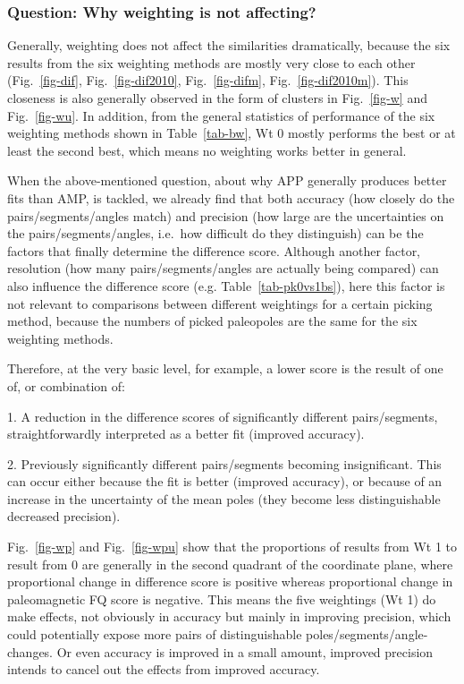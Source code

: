\subsubsection{Question: Why weighting is not affecting?}

Generally, weighting does not affect the similarities dramatically, because the
six results from the six weighting methods are mostly very close to each other
(Fig.~\ref{fig-dif}, Fig.~\ref{fig-dif2010}, Fig.~\ref{fig-difm},
Fig.~\ref{fig-dif2010m}). This closeness is also generally observed in the form
of clusters in Fig.~\ref{fig-w} and Fig.~\ref{fig-wu}. In addition, from the
general statistics of performance of the six weighting methods shown in
Table~\ref{tab-bw}, Wt 0 mostly performs the best or at least the
second best, which means no weighting works better in general.

When the above-mentioned question, about why APP generally produces better fits
than AMP, is tackled, we already find that both accuracy (how closely do the
pairs/segments/angles match) and precision (how large are the uncertainties on
the pairs/segments/angles, i.e.\ how difficult do they distinguish) can be the
factors that finally determine the difference score. Although another factor,
resolution (how many pairs/segments/angles are actually being compared) can
also influence the difference score (e.g. Table~\ref{tab-pk0vs1bs}), here this
factor is not relevant to comparisons between different weightings for a
certain picking method, because the numbers of picked paleopoles are the same
for the six weighting methods.

Therefore, at the very basic level, for example, a lower score is the result of
one of, or combination of:

1. A reduction in the difference scores of significantly different
pairs/segments, straightforwardly interpreted as a better fit (improved
accuracy).

2. Previously significantly different pairs/segments becoming insignificant.
This can occur either because the fit is better (improved accuracy), or because
of an increase in the uncertainty of the mean poles (they become less
distinguishable \textemdash{} decreased precision).

Fig.~\ref{fig-wp} and Fig.~\ref{fig-wpu} show that the proportions of results
from Wt 1 to result from 0 are generally in the second
quadrant of the coordinate plane, where proportional change in difference score
is positive whereas proportional change in paleomagnetic FQ score is negative.
This means the five weightings (Wt 1) do make effects, not obviously
in accuracy but mainly in improving precision, which could potentially expose
more pairs of distinguishable poles/segments/angle-changes. Or even accuracy is
improved in a small amount, improved precision intends to cancel out the effects
from improved accuracy.


